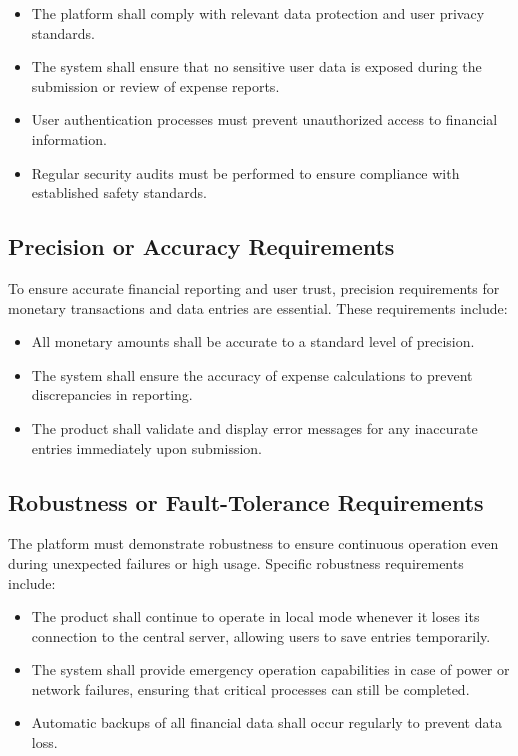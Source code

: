 \documentclass[12pt]{article}
\begin{document}
\begin{itemize}
    \item The platform shall comply with relevant data protection and user privacy standards.
    \item The system shall ensure that no sensitive user data is exposed during the submission or review of expense reports.
    \item User authentication processes must prevent unauthorized access to financial information.
    \item Regular security audits must be performed to ensure compliance with established safety standards.
\end{itemize}

\subsection{Precision or Accuracy Requirements}
To ensure accurate financial reporting and user trust, precision requirements for monetary transactions and data entries are essential. These requirements include:

\begin{itemize}
    \item All monetary amounts shall be accurate to a standard level of precision.
    \item The system shall ensure the accuracy of expense calculations to prevent discrepancies in reporting.
    \item The product shall validate and display error messages for any inaccurate entries immediately upon submission.
\end{itemize}

\subsection{Robustness or Fault-Tolerance Requirements}
The platform must demonstrate robustness to ensure continuous operation even during unexpected failures or high usage. Specific robustness requirements include:

\begin{itemize}
    \item The product shall continue to operate in local mode whenever it loses its connection to the central server, allowing users to save entries temporarily.
    \item The system shall provide emergency operation capabilities in case of power or network failures, ensuring that critical processes can still be completed.
    \item Automatic backups of all financial data shall occur regularly to prevent data loss.
\end{itemize}
\end{document}
